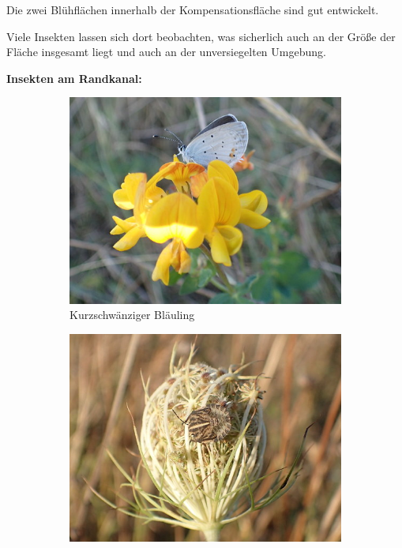 \documentclass[10pt]{article}
\begin{document}
Die zwei Blühflächen innerhalb der Kompensationsfläche sind gut entwickelt.

Viele Insekten lassen sich dort beobachten, was sicherlich auch an der Größe der Fläche insgesamt liegt und auch an der unversiegelten Umgebung.

\clearpage
\textbf{Insekten am Randkanal:}

\begin{figure}[h!]
  \centering
  \begin{subfigure}[b]{0.44\linewidth}
    \includegraphics[width=\linewidth]{img/randkanal/blauling.jpg}
    \caption{Kurzschwänziger Bläuling}
  \end{subfigure}
  \begin{subfigure}[b]{0.44\linewidth}
    \includegraphics[width=\linewidth]{img/randkanal/streifenwanze.jpg}

\end{subfigure}
\end{figure}
\end{document}
